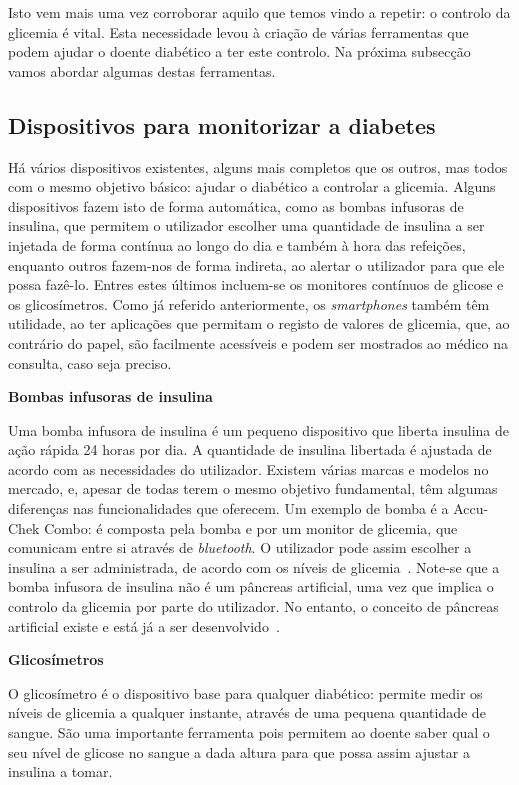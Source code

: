 Isto vem mais uma vez corroborar aquilo que temos vindo a repetir: o controlo da glicemia é vital. Esta necessidade levou à criação de várias ferramentas que podem ajudar o doente diabético a ter este controlo. Na próxima subsecção vamos abordar algumas destas ferramentas.


\subsection{Dispositivos para monitorizar a diabetes}

Há vários dispositivos existentes, alguns mais completos que os outros, mas todos com o mesmo objetivo básico: ajudar o diabético a controlar a glicemia. Alguns dispositivos fazem isto de forma automática, como as bombas infusoras de insulina, que permitem o utilizador escolher uma quantidade de insulina a ser injetada de forma contínua ao longo do dia e também à hora das refeições, enquanto outros fazem-nos de forma indireta, ao alertar o utilizador para que ele possa fazê-lo. Entres estes últimos incluem-se os monitores contínuos de glicose e os glicosímetros. 
Como já referido anteriormente, os \textit{smartphones} também têm utilidade, ao ter aplicações que permitam o registo de valores de glicemia, que, ao contrário do papel, são facilmente acessíveis e podem ser mostrados ao médico na consulta, caso seja preciso.

\textbf{Bombas infusoras de insulina}

Uma bomba infusora de insulina é um pequeno dispositivo que liberta insulina de ação rápida 24 horas por dia. A quantidade de insulina libertada é ajustada de acordo com as necessidades do utilizador. Existem várias marcas e modelos no mercado, e, apesar de todas terem o mesmo objetivo fundamental, têm algumas diferenças nas funcionalidades que oferecem. Um exemplo de bomba é a Accu-Chek Combo: é composta pela bomba e por um monitor de glicemia, que comunicam entre si através de \textit{bluetooth}. O utilizador pode assim escolher a insulina a ser administrada, de acordo com os níveis de glicemia~\cite{akku}. Note-se que a bomba infusora de insulina não é um pâncreas artificial, uma vez que implica o controlo da glicemia por parte do utilizador. No entanto, o conceito de pâncreas artificial existe e está já a ser desenvolvido~\cite{pancreas}.

\textbf{Glicosímetros}

O glicosímetro é o dispositivo base para qualquer diabético: permite medir os níveis de glicemia a qualquer instante, através de uma pequena quantidade de sangue. São uma importante ferramenta pois permitem ao doente saber qual o seu nível de glicose no sangue a dada altura para que possa assim ajustar a insulina a tomar.


